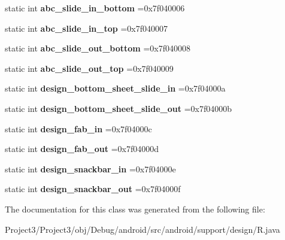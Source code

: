 \begin{DoxyCompactItemize}
static int {\bfseries abc\+\_\+slide\+\_\+in\+\_\+bottom} =0x7f040006
\item 
\mbox{\label{classandroid_1_1support_1_1design_1_1R_1_1anim_a1c8e7b8df77c8923bd061b84210d02d5}} 
static int {\bfseries abc\+\_\+slide\+\_\+in\+\_\+top} =0x7f040007
\item 
\mbox{\label{classandroid_1_1support_1_1design_1_1R_1_1anim_a14ad57814c50ebea2255cedd1b98a76b}} 
static int {\bfseries abc\+\_\+slide\+\_\+out\+\_\+bottom} =0x7f040008
\item 
\mbox{\label{classandroid_1_1support_1_1design_1_1R_1_1anim_a76f66ee1b5dc6d98f643ee3d6b1fec70}} 
static int {\bfseries abc\+\_\+slide\+\_\+out\+\_\+top} =0x7f040009
\item 
\mbox{\label{classandroid_1_1support_1_1design_1_1R_1_1anim_ac451032b6a367f35d79a18a3d41d47ae}} 
static int {\bfseries design\+\_\+bottom\+\_\+sheet\+\_\+slide\+\_\+in} =0x7f04000a
\item 
\mbox{\label{classandroid_1_1support_1_1design_1_1R_1_1anim_a264598fce61c4cc409a08afb23e5a27e}} 
static int {\bfseries design\+\_\+bottom\+\_\+sheet\+\_\+slide\+\_\+out} =0x7f04000b
\item 
\mbox{\label{classandroid_1_1support_1_1design_1_1R_1_1anim_aa3de53c3b4e61608990e2fb6509f91fd}} 
static int {\bfseries design\+\_\+fab\+\_\+in} =0x7f04000c
\item 
\mbox{\label{classandroid_1_1support_1_1design_1_1R_1_1anim_a78e68154b70b9751eccbc03f1a65766d}} 
static int {\bfseries design\+\_\+fab\+\_\+out} =0x7f04000d
\item 
\mbox{\label{classandroid_1_1support_1_1design_1_1R_1_1anim_a2a36c0d0f34b9f4d2f41b22165febda3}} 
static int {\bfseries design\+\_\+snackbar\+\_\+in} =0x7f04000e
\item 
\mbox{\label{classandroid_1_1support_1_1design_1_1R_1_1anim_ae2b0f0593427ea80725e5b454582849d}} 
static int {\bfseries design\+\_\+snackbar\+\_\+out} =0x7f04000f
\end{DoxyCompactItemize}


The documentation for this class was generated from the following file\+:\begin{DoxyCompactItemize}
\item 
Project3/\+Project3/obj/\+Debug/android/src/android/support/design/R.\+java\end{DoxyCompactItemize}
